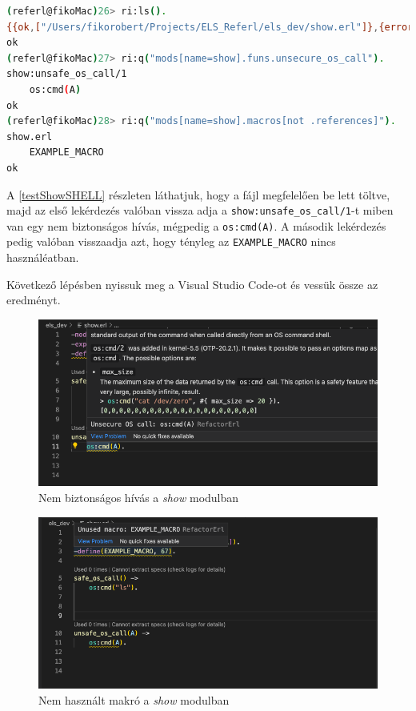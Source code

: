 \begin{lstlisting}[language={sh}]  
(referl@fikoMac)26> ri:ls().                                        
{{ok,["/Users/fikorobert/Projects/ELS_Referl/els_dev/show.erl"]},{error,[]}}
ok
(referl@fikoMac)27> ri:q("mods[name=show].funs.unsecure_os_call").  
show:unsafe_os_call/1
    os:cmd(A)
ok
(referl@fikoMac)28> ri:q("mods[name=show].macros[not .references]").
show.erl
    EXAMPLE_MACRO
ok
\end{lstlisting}

A \ref{testShowSHELL} részleten láthatjuk, hogy a fájl megfelelően be lett töltve, majd az első lekérdezés valóban vissza adja a \lstinline{show:unsafe_os_call/1}-t miben van egy nem biztonságos hívás, mégpedig a \lstinline{os:cmd(A)}. A második lekérdezés pedig valóban visszaadja azt, hogy tényleg az \lstinline{EXAMPLE_MACRO} nincs használéatban.

\noindent Következő lépésben nyissuk meg a Visual Studio Code-ot és vessük össze az eredményt.

\begin{figure}[H]
  \centering
  \includegraphics[width=\linewidth]{images/testCases/showUnsecure.png}
  \caption{Nem biztonságos hívás a \textit{show} modulban}
  \label{fig:showUnsecure}
\end{figure}


\begin{figure}[H]
  \centering
  \includegraphics[width=\linewidth]{images/testCases/showMacro.png}
  \caption{Nem használt makró a \textit{show} modulban}
  \label{fig:showMacro}
\end{figure}

